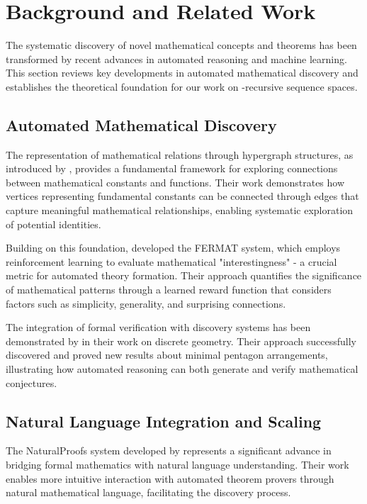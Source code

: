 \section{Background and Related Work}

The systematic discovery of novel mathematical concepts and theorems has been transformed by recent advances in automated reasoning and machine learning. This section reviews key developments in automated mathematical discovery and establishes the theoretical foundation for our work on $$-recursive sequence spaces.

\subsection{Automated Mathematical Discovery}

The representation of mathematical relations through hypergraph structures, as introduced by \cite{halachmi2024ramanujan}, provides a fundamental framework for exploring connections between mathematical constants and functions. Their work demonstrates how vertices representing fundamental constants can be connected through edges that capture meaningful mathematical relationships, enabling systematic exploration of potential identities.

Building on this foundation, \cite{tsoukalas2025learning} developed the FERMAT system, which employs reinforcement learning to evaluate mathematical "interestingness" - a crucial metric for automated theory formation. Their approach quantifies the significance of mathematical patterns through a learned reward function that considers factors such as simplicity, generality, and surprising connections.

The integration of formal verification with discovery systems has been demonstrated by \cite{subercaseaux2023automated} in their work on discrete geometry. Their approach successfully discovered and proved new results about minimal pentagon arrangements, illustrating how automated reasoning can both generate and verify mathematical conjectures.

\subsection{Natural Language Integration and Scaling}

The NaturalProofs system developed by \cite{welleck2021naturalproofs} represents a significant advance in bridging formal mathematics with natural language understanding. Their work enables more intuitive interaction with automated theorem provers through natural mathematical language, facilitating the discovery process.

